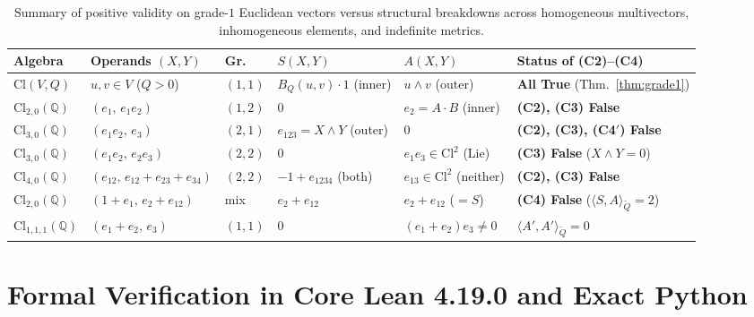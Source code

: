 \documentclass[11pt]{article}
\theoremstyle{plain}
\theoremstyle{definition}
\theoremstyle{remark}
\newcommand{\Cl}{\mathrm{Cl}}
\begin{document}
\begin{table}[htbp]
\centering
\footnotesize
\setlength{\tabcolsep}{3.8pt}
\renewcommand{\arraystretch}{1.22}
\begin{tabular}{@{}llllll@{}}
\toprule
\textbf{Algebra} & \textbf{Operands $(X, Y)$} & \textbf{Gr.} & $S(X, Y)$ & $A(X, Y)$ & \textbf{Status of (C2)--(C4)} \\
\midrule
$\Cl(V, Q)$ & $u, v \in V$ ($Q > 0$) & $(1, 1)$ & $B_Q(u, v)\cdot 1$ (inner) & $u \wedge v$ (outer) & \textbf{All True} (Thm.~\ref{thm:grade1}) \\
$\Cl_{2,0}(\mathbb{Q})$ & $(e_1,\, e_1 e_2)$ & $(1, 2)$ & $0$ & $e_2 = A \cdot B$ (inner) & \textbf{(C2), (C3) False} \\
$\Cl_{3,0}(\mathbb{Q})$ & $(e_1 e_2,\, e_3)$ & $(2, 1)$ & $e_{123} = X \wedge Y$ (outer) & $0$ & \textbf{(C2), (C3), (C4$'$) False} \\
$\Cl_{3,0}(\mathbb{Q})$ & $(e_1 e_2,\, e_2 e_3)$ & $(2, 2)$ & $0$ & $e_1 e_3 \in \Cl^2$ (Lie) & \textbf{(C3) False} ($X \wedge Y = 0$) \\
$\Cl_{4,0}(\mathbb{Q})$ & $(e_{12},\, e_{12}+e_{23}+e_{34})$ & $(2, 2)$ & $-1 + e_{1234}$ (both) & $e_{13} \in \Cl^2$ (neither) & \textbf{(C2), (C3) False} \\
$\Cl_{2,0}(\mathbb{Q})$ & $(1+e_1,\, e_2+e_{12})$ & mix & $e_2 + e_{12}$ & $e_2 + e_{12}$ ($= S$) & \textbf{(C4) False} ($\langle S, A \rangle_{\widetilde{Q}} = 2$) \\
$\Cl_{1,1,1}(\mathbb{Q})$ & $(e_1+e_2,\, e_3)$ & $(1, 1)$ & $0$ & $(e_1+e_2)e_3 \neq 0$ & $\langle A', A' \rangle_{\widetilde{Q}} = 0$ \\
\bottomrule
\end{tabular}
\caption{Summary of positive validity on grade-$1$ Euclidean vectors versus structural breakdowns across homogeneous multivectors, inhomogeneous elements, and indefinite metrics.}
\label{tab:summary}
\end{table}

\section{Formal Verification in Core Lean 4.19.0 and Exact Python}
\end{document}
